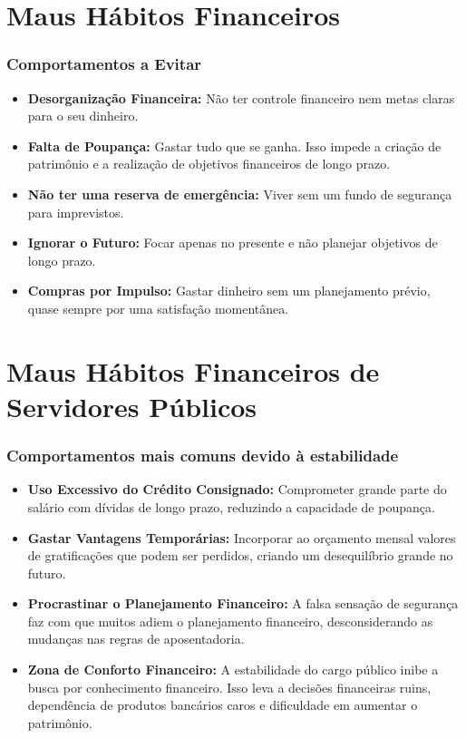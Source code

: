 \section{Maus Hábitos Financeiros}

\begin{frame}[c]\frametitle{Comportamentos a Evitar}
  \begin{itemize}
    \item \textbf{Desorganização Financeira:} Não ter controle financeiro nem metas claras para o seu dinheiro.
    \item \textbf{Falta de Poupança:} Gastar tudo que se ganha. Isso impede a criação de patrimônio e a realização de objetivos financeiros de longo prazo.
    \item \textbf{Não ter uma reserva de emergência:} Viver sem um fundo de segurança para imprevistos.
    \item \textbf{Ignorar o Futuro:} Focar apenas no presente e não planejar objetivos de longo prazo.
    \item \textbf{Compras por Impulso:} Gastar dinheiro sem um planejamento prévio, quase sempre por uma satisfação momentânea.
  \end{itemize}
\end{frame}

\section{Maus Hábitos Financeiros de Servidores Públicos}

\begin{frame}[c]\frametitle{Comportamentos mais comuns devido à estabilidade}
  \begin{itemize}
    \item \textbf{Uso Excessivo do Crédito Consignado:} Comprometer grande parte do salário com dívidas de longo prazo, reduzindo a capacidade de poupança.
    \item \textbf{Gastar Vantagens Temporárias:} Incorporar ao orçamento mensal valores de gratificações que podem ser perdidos, criando um desequilíbrio grande no futuro.
    \item \textbf{Procrastinar o Planejamento Financeiro:} A falsa sensação de segurança faz com que muitos adiem o planejamento financeiro, desconsiderando as mudanças nas regras de aposentadoria.
    \item \textbf{Zona de Conforto Financeiro:} A estabilidade do cargo público inibe a busca por conhecimento financeiro. Isso leva a decisões financeiras ruins, dependência de produtos bancários caros e dificuldade em aumentar o patrimônio.
  \end{itemize}
\end{frame}

